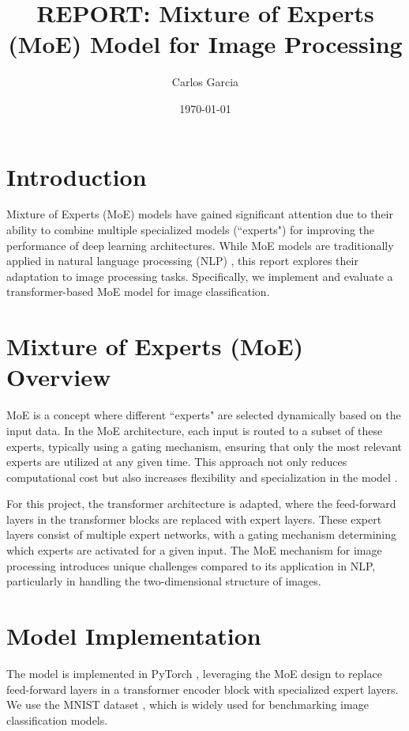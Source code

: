 \documentclass[a4paper,11pt]{article}
\title{REPORT: Mixture of Experts (MoE) Model for Image Processing}
\author{Carlos Garcia}
\date{\today}
\begin{document}
\maketitle

\section{Introduction}
Mixture of Experts (MoE) models have gained significant attention due to their ability to combine multiple specialized models (``experts") for improving the performance of deep learning architectures. While MoE models are traditionally applied in natural language processing (NLP) \cite{shazeer2017outrageously}, this report explores their adaptation to image processing tasks. Specifically, we implement and evaluate a transformer-based MoE model for image classification.

\section{Mixture of Experts (MoE) Overview}
MoE is a concept where different ``experts" are selected dynamically based on the input data. In the MoE architecture, each input is routed to a subset of these experts, typically using a gating mechanism, ensuring that only the most relevant experts are utilized at any given time. This approach not only reduces computational cost but also increases flexibility and specialization in the model \cite{huggingfaceMixtureExperts}.

For this project, the transformer architecture \cite{vaswani2017attention} is adapted, where the feed-forward layers in the transformer blocks are replaced with expert layers. These expert layers consist of multiple expert networks, with a gating mechanism determining which experts are activated for a given input. The MoE mechanism for image processing introduces unique challenges compared to its application in NLP, particularly in handling the two-dimensional structure of images.

\section{Model Implementation}
The model is implemented in PyTorch \cite{pytorch}, leveraging the MoE design to replace feed-forward layers in a transformer encoder block with specialized expert layers. We use the MNIST dataset \cite{lecun1998mnist}, which is widely used for benchmarking image classification models.
\end{document}
